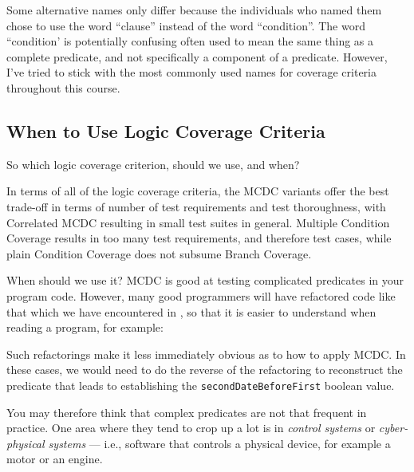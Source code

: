 Some alternative names only differ because the individuals who named them chose
to use the word ``clause'' instead of the word ``condition''. The word
``condition' is potentially confusing often used to mean the same thing as a
complete predicate, and not specifically a component of a predicate. However,
I've tried to stick with the most commonly used names for coverage criteria
throughout this course.


\subsection{When to Use Logic Coverage Criteria}

So which logic coverage criterion, should we use, and when? 


In terms of all of the logic coverage criteria, the MCDC variants offer the best
trade-off in terms of number of test requirements and test thoroughness, with
Correlated MCDC resulting in small test suites in general. Multiple Condition
Coverage results in too many test requirements, and therefore test cases, while
plain Condition Coverage does not subsume Branch Coverage.

When should we use it? MCDC is good at testing complicated predicates in
your program code. However, many good programmers will have refactored code
like that which we have encountered in \daysbetweentwodatesmethod,
so that it is easier to understand when reading a program, for example:


\begin{center} 
\end{center}  

Such refactorings make it less immediately obvious as to how to apply MCDC. In
these cases, we would need to do the reverse of the refactoring to reconstruct
the predicate that leads to establishing the {\tt secondDateBeforeFirst} boolean
value.

You may therefore think that complex predicates are not that frequent in
practice. One area where they tend to crop up a lot is in {\it control systems}
or {\it cyber-physical systems} --- i.e., software that controls a physical
device, for example a motor or an engine.

